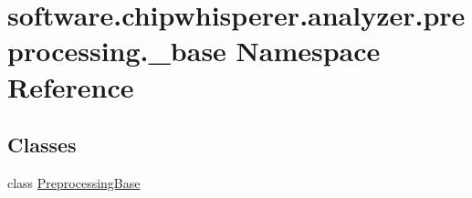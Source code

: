 \hypertarget{namespacesoftware_1_1chipwhisperer_1_1analyzer_1_1preprocessing_1_1__base}{}\section{software.\+chipwhisperer.\+analyzer.\+preprocessing.\+\_\+base Namespace Reference}
\label{namespacesoftware_1_1chipwhisperer_1_1analyzer_1_1preprocessing_1_1__base}
\subsection*{Classes}
\begin{DoxyCompactItemize}
\item 
class \hyperlink{classsoftware_1_1chipwhisperer_1_1analyzer_1_1preprocessing_1_1__base_1_1PreprocessingBase}{Preprocessing\+Base}
\end{DoxyCompactItemize}
